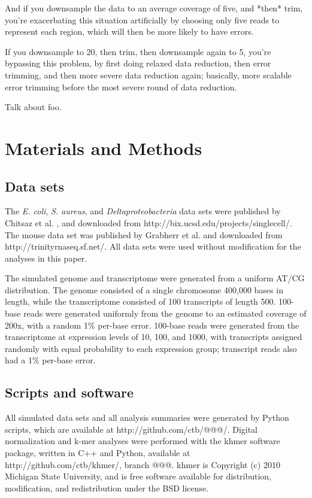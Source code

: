 \documentclass[10pt]{article}
\begin{document}
And if you downsample the data to an average coverage of five, and
*then* trim, you're exacerbating this situation artificially by
choosing only five reads to represent each region, which will then be
more likely to have errors.

If you downsample to 20, then trim, then
downsample again to 5, you're bypassing this problem, by first doing
relaxed data reduction, then error trimming, and then more severe data
reduction again; basically, more scalable error trimming before the
most severe round of data reduction.

Talk about foo.

\section*{Materials and Methods}

\subsection*{Data sets}

The {\em E. coli}, {\em S. aureus}, and {\em Deltaproteobacteria} data sets
were published by Chitsaz et al. \cite{pubmed21926975}, and downloaded
from http://bix.ucsd.edu/projects/singlecell/.  The mouse data set was
published by Grabherr et al. \cite{pubmed21572440} and downloaded
from http://trinityrnaseq.sf.net/.  All data sets were used without
modification for the analyses in this paper.

The simulated genome and transcriptome were generated from a uniform
AT/CG distribution.  The genome consisted of a single chromosome
400,000 bases in length, while the transcriptome consisted of 100 transcripts
of length 500.  100-base reads were generated uniformly from the genome
to an estimated coverage of 200x, with a random 1\% per-base error.
100-base reads were generated from the transcriptome at expression levels
of 10, 100, and 1000, with transcripts assigned randomly with equal probability
to each expression group; transcript reads also had a 1\% per-base error.

\subsection*{Scripts and software}

All simulated data sets and all analysis summaries were generated by
Python scripts, which are available at http://github.com/ctb/@@@/.
Digital normalization and k-mer analyses were performed with the khmer
software package, written in C++ and Python, available at
http://github.com/ctb/khmer/, branch @@@.  khmer is Copyright (c) 2010
Michigan State University, and is free software available for
distribution, modification, and redistribution under the BSD license.
\end{document}
